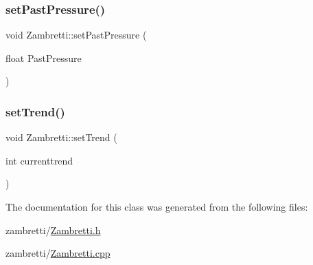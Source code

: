 \mbox{\label{class_zambretti_aaf38d93e2550c2c6f081f9d8f346e2fb}} 
\subsubsection{\texorpdfstring{set\+Past\+Pressure()}{setPastPressure()}}
{\footnotesize\ttfamily void Zambretti\+::set\+Past\+Pressure (\begin{DoxyParamCaption}\item[{float}]{Past\+Pressure }\end{DoxyParamCaption})}

\mbox{\label{class_zambretti_a9237fb46dd347d7b0c5ecec1b9c4becc}} 
\subsubsection{\texorpdfstring{set\+Trend()}{setTrend()}}
{\footnotesize\ttfamily void Zambretti\+::set\+Trend (\begin{DoxyParamCaption}\item[{int}]{currenttrend }\end{DoxyParamCaption})}



The documentation for this class was generated from the following files\+:\begin{DoxyCompactItemize}
\item 
zambretti/\hyperlink{_zambretti_8h}{Zambretti.\+h}\item 
zambretti/\hyperlink{_zambretti_8cpp}{Zambretti.\+cpp}\end{DoxyCompactItemize}
